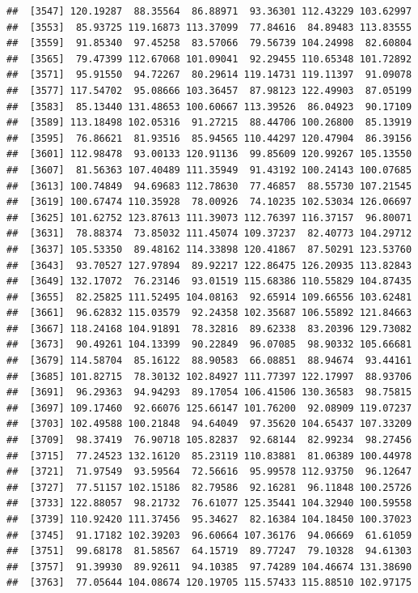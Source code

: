 \documentclass[
]{article}
\begin{document}
\begin{verbatim}
##  [3547] 120.19287  88.35564  86.88971  93.36301 112.43229 103.62997
##  [3553]  85.93725 119.16873 113.37099  77.84616  84.89483 113.83555
##  [3559]  91.85340  97.45258  83.57066  79.56739 104.24998  82.60804
##  [3565]  79.47399 112.67068 101.09041  92.29455 110.65348 101.72892
##  [3571]  95.91550  94.72267  80.29614 119.14731 119.11397  91.09078
##  [3577] 117.54702  95.08666 103.36457  87.98123 122.49903  87.05199
##  [3583]  85.13440 131.48653 100.60667 113.39526  86.04923  90.17109
##  [3589] 113.18498 102.05316  91.27215  88.44706 100.26800  85.13919
##  [3595]  76.86621  81.93516  85.94565 110.44297 120.47904  86.39156
##  [3601] 112.98478  93.00133 120.91136  99.85609 120.99267 105.13550
##  [3607]  81.56363 107.40489 111.35949  91.43192 100.24143 100.07685
##  [3613] 100.74849  94.69683 112.78630  77.46857  88.55730 107.21545
##  [3619] 100.67474 110.35928  78.00926  74.10235 102.53034 126.06697
##  [3625] 101.62752 123.87613 111.39073 112.76397 116.37157  96.80071
##  [3631]  78.88374  73.85032 111.45074 109.37237  82.40773 104.29712
##  [3637] 105.53350  89.48162 114.33898 120.41867  87.50291 123.53760
##  [3643]  93.70527 127.97894  89.92217 122.86475 126.20935 113.82843
##  [3649] 132.17072  76.23146  93.01519 115.68386 110.55829 104.87435
##  [3655]  82.25825 111.52495 104.08163  92.65914 109.66556 103.62481
##  [3661]  96.62832 115.03579  92.24358 102.35687 106.55892 121.84663
##  [3667] 118.24168 104.91891  78.32816  89.62338  83.20396 129.73082
##  [3673]  90.49261 104.13399  90.22849  96.07085  98.90332 105.66681
##  [3679] 114.58704  85.16122  88.90583  66.08851  88.94674  93.44161
##  [3685] 101.82715  78.30132 102.84927 111.77397 122.17997  88.93706
##  [3691]  96.29363  94.94293  89.17054 106.41506 130.36583  98.75815
##  [3697] 109.17460  92.66076 125.66147 101.76200  92.08909 119.07237
##  [3703] 102.49588 100.21848  94.64049  97.35620 104.65437 107.33209
##  [3709]  98.37419  76.90718 105.82837  92.68144  82.99234  98.27456
##  [3715]  77.24523 132.16120  85.23119 110.83881  81.06389 100.44978
##  [3721]  71.97549  93.59564  72.56616  95.99578 112.93750  96.12647
##  [3727]  77.51157 102.15186  82.79586  92.16281  96.11848 100.25726
##  [3733] 122.88057  98.21732  76.61077 125.35441 104.32940 100.59558
##  [3739] 110.92420 111.37456  95.34627  82.16384 104.18450 100.37023
##  [3745]  91.17182 102.39203  96.60664 107.36176  94.06669  61.61059
##  [3751]  99.68178  81.58567  64.15719  89.77247  79.10328  94.61303
##  [3757]  91.39930  89.92611  94.10385  97.74289 104.46674 131.38690
##  [3763]  77.05644 104.08674 120.19705 115.57433 115.88510 102.97175

\end{verbatim}
\end{document}
